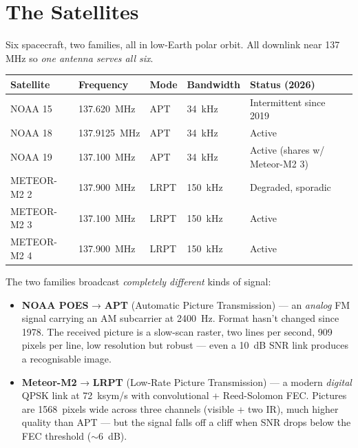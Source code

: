 \documentclass[11pt,a4paper]{article}
\begin{document}
\section{The Satellites}

Six spacecraft, two families, all in low-Earth polar orbit.  All
downlink near 137\,MHz so \emph{one antenna serves all six}.

\begin{center}
\begin{tabular}{@{}lllll@{}}
\toprule
\textbf{Satellite} & \textbf{Frequency} & \textbf{Mode} & \textbf{Bandwidth} & \textbf{Status (2026)} \\
\midrule
NOAA 15         & \SI{137.620}{MHz} & APT   & \SI{34}{kHz}  & Intermittent since 2019 \\
NOAA 18         & \SI{137.9125}{MHz}& APT   & \SI{34}{kHz}  & Active \\
NOAA 19         & \SI{137.100}{MHz} & APT   & \SI{34}{kHz}  & Active (shares w/ Meteor-M2 3) \\
METEOR-M2 2     & \SI{137.900}{MHz} & LRPT  & \SI{150}{kHz} & Degraded, sporadic \\
METEOR-M2 3     & \SI{137.100}{MHz} & LRPT  & \SI{150}{kHz} & Active \\
METEOR-M2 4     & \SI{137.900}{MHz} & LRPT  & \SI{150}{kHz} & Active \\
\bottomrule
\end{tabular}
\end{center}

The two families broadcast \emph{completely different} kinds of signal:

\begin{itemize}
  \item \textbf{NOAA POES} → \textbf{APT} (Automatic Picture
        Transmission) — an \emph{analog} FM signal carrying an AM
        subcarrier at \SI{2400}{Hz}.  Format hasn't changed since
        1978.  The received picture is a slow-scan raster, two lines
        per second, 909 pixels per line, low resolution but robust —
        even a \SI{10}{dB} SNR link produces a recognisable image.
  \item \textbf{Meteor-M2} → \textbf{LRPT} (Low-Rate Picture
        Transmission) — a modern \emph{digital} QPSK link at
        \SI{72}{ksym/s} with convolutional + Reed-Solomon FEC.
        Pictures are \SI{1568}{pixels} wide across three channels
        (visible + two IR), much higher quality than APT — but the
        signal falls off a cliff when SNR drops below the FEC
        threshold ($\sim$\SI{6}{dB}).
\end{itemize}
\end{document}
